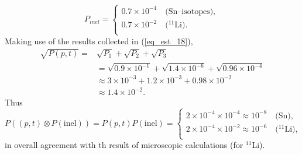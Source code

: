 \documentclass[a4paper,14pt]{article}
\begin{document}
\begin{equation}\label{eq_est_32}
P_{inel}=\left\{
\begin{array}{l}
  0.7\times 10^{-4} \quad \text{(Sn--isotopes)}, \\
   0.7\times 10^{-2} \quad \text{($^{11}$Li)}. \\
\end{array}
\right.
\end{equation}
Making use of the results collected in (\ref{eq_est_18}),
\begin{equation}\label{eq_est_33}
\begin{split}
\sqrt{P(p,t)}=&\sqrt{P_1}+\sqrt{P_2}+\sqrt{P_3}\\
&=\sqrt{0.9\times 10^{-1}}+\sqrt{1.4\times 10^{-6}}+\sqrt{0.96\times 10^{-4}}\\
&\approx 3\times 10^{-3}+1.2\times 10^{-3}+0.98\times 10^{-2}\\
&\approx 1.4 \times 10^{-2}.
\end{split}
\end{equation}
Thus
\begin{equation}\label{eq_est_34}
P((p,t)\otimes P(\text{inel}))=P(p,t)P(\text{inel})=\left\{
\begin{array}{l}
  2\times 10^{-4}\times 10^{-4}\approx 10^{-8} \quad \text{(Sn)}, \\
   2\times 10^{-4}\times 10^{-2}\approx 10^{-6} \quad \text{($^{11}$Li)}, \\
\end{array}
\right.
\end{equation}
in overall agreement with th result of microscopic calculations (for $^{11}$Li).
\end{document}
